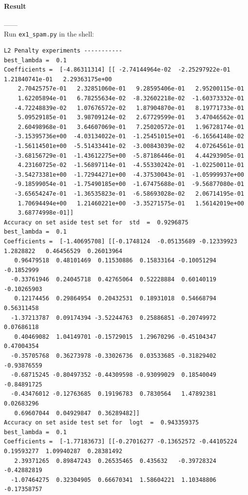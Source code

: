 \documentclass{article}
\begin{document}
\paragraph{Result\\}
------\\
Run \verb|ex1_spam.py| in the shell:
\begin{tiny}
\begin{lstlisting}
L2 Penalty experiments -----------
best_lambda =  0.1
Coefficients =  [-4.86311314] [[ -2.74144964e-02  -2.25297922e-01   1.21840741e-01   2.29363175e+00
    2.70425757e-01   2.32851060e-01   9.28595406e-01   2.95200115e-01
    1.62205894e-01   6.78255634e-02  -8.32602218e-02  -1.60373332e-01
   -4.72248839e-02   1.07676572e-02   1.87904870e-01   8.19771733e-01
    5.09529185e-01   3.98709124e-02   2.67729599e-01   3.47046562e-01
    2.60498968e-01   3.64607069e-01   7.25020572e-01   1.96728174e-01
   -3.15395736e+00  -4.03134022e-01  -1.25451015e+01  -6.16564148e-02
   -1.56114501e+00  -5.51433441e-02  -3.00843039e-02   4.07264561e-01
   -3.68156729e-01  -1.43612275e+00  -5.87186446e-01   4.44293905e-01
    4.23160725e-02  -1.56897114e-01  -4.55330242e-01  -1.02250011e-01
   -3.54273381e+00  -1.72944271e+00  -4.37530043e-01  -1.05999937e+00
   -9.18599054e-01  -1.75490185e+00  -1.67475688e-01  -9.56877080e-01
   -3.65654247e-01  -1.36535823e-01  -6.58693028e-02   2.06714195e-01
    1.70694494e+00   1.21460221e+00  -3.35271575e-01   1.56142019e+00
    3.68774998e-01]]
Accuracy on set aside test set for  std  =  0.9296875
best_lambda =  0.1
Coefficients =  [-1.40695708] [[-0.1748124  -0.05135689 -0.12339923  1.2828822   0.46456529  0.26013964
   0.96479518  0.48101469  0.11530886  0.15833164 -0.10051294 -0.1852999
  -0.33761946  0.24045718  0.42765064  0.52228884  0.60140119 -0.10265903
   0.12174456  0.29864954  0.20432531  0.18931018  0.54668794  0.56311458
  -1.37213787  0.09174394 -3.52244763  0.25886851 -0.20749972  0.07686118
   0.40469082  1.04149701 -0.15729015  1.29670296 -0.45104347  0.47004354
  -0.35705768  0.36273978 -0.33026736  0.03533685 -0.31829402 -0.93876559
  -0.68715245 -0.80497352 -0.44309598 -0.93099029  0.18540049 -0.84891725
  -0.43476012 -0.12763685  0.19196783  0.7830564   1.47892381  0.02683296
   0.69607044  0.04929847  0.36289482]]
Accuracy on set aside test set for  logt  =  0.943359375
best_lambda =  0.1
Coefficients =  [-1.77183673] [[-0.27016277 -0.13652572 -0.44105224  0.19593277  1.09940287  0.28381492
   2.39371265  0.89847243  0.26535465  0.435632   -0.39728324 -0.42882819
  -1.07464275  0.32304905  0.66670341  1.58604221  1.10348806 -0.17358757

\end{lstlisting}
\end{tiny}
\end{document}
